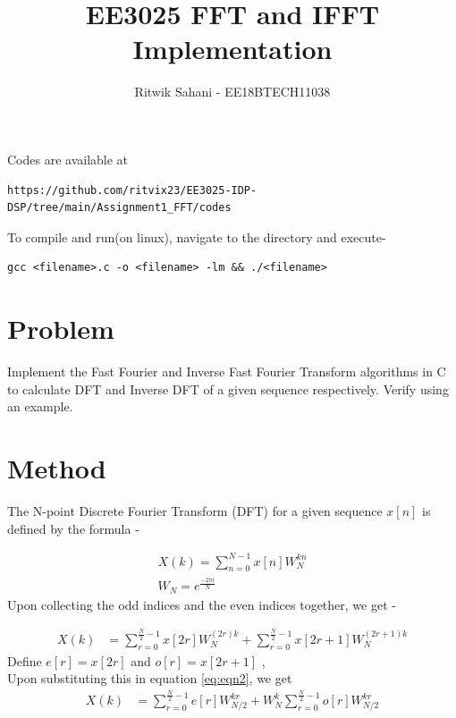 \documentclass[journal,12pt,twocolumn]{IEEEtran}
\begin{document}
     \def\rightbox#1{\makebox[0in][r]{#1}}
     \def\centbox#1{\makebox[0in]{#1}}
     \def\topbox#1{\raisebox{-\baselineskip}[0in][0in]{#1}}
     \def\midbox#1{\raisebox{-0.5\baselineskip}[0in][0in]{#1}}
\vspace{3cm}
\title{EE3025 FFT and IFFT Implementation}
\author{Ritwik Sahani - EE18BTECH11038}
\maketitle
\newpage
\renewcommand{\thefigure}{\theenumi}
\renewcommand{\thetable}{\theenumi}
\bigskip
Codes are available at 
\begin{lstlisting}
https://github.com/ritvix23/EE3025-IDP-DSP/tree/main/Assignment1_FFT/codes
\end{lstlisting}
To compile and run(on linux), navigate to the directory and execute- 
\begin{lstlisting}
gcc <filename>.c -o <filename> -lm && ./<filename>
\end{lstlisting}
\section{Problem}
Implement the Fast Fourier and Inverse Fast Fourier Transform algorithms in C to calculate DFT and Inverse DFT of a given sequence respectively. Verify using an example.

\section{Method}
The N-point Discrete Fourier Transform (DFT) for a given sequence $x[n]$ is defined by the formula - 

\begin{align}
X(k) = \sum_{n=0}^{N-1}x[n]W_{N}^{kn} \label{eq:eqn1}\\
W_N = e^\frac{-2\pi i}{N}
\end{align}
Upon collecting the odd indices and the even indices together, we get - 

\begin{align}
X(k) &= \sum_{r=0}^{\frac{N}{2}-1}x[2r]W_{N}^{(2r)k} + \sum_{r=0}^{\frac{N}{2}-1}x[2r+1]W_{N}^{(2r+1)k} \label{eq:eqn2}
\end{align}
Define     $e[r]=x[2r]$ and $o[r]=x[2r+1]$ , \\
Upon  substituting this in equation \ref{eq:eqn2}, we get
\begin{align}
    X(k) &= \sum_{r=0}^{\frac{N}{2}-1}e[r]W_{N/2}^{kr} + W_{N}^k\sum_{r=0}^{\frac{N}{2}-1}o[r]W_{N/2}^{kr}
    \label{eq:eq3}
\end{align}
\end{document}
